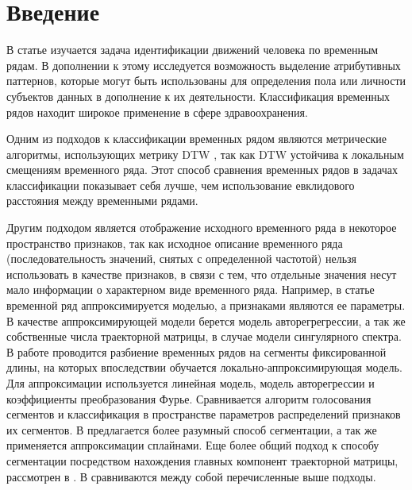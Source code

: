 \documentclass[12pt, twoside]{article}
\begin{document}

\maketitle
\linenumbers

\section{Введение}
В статье изучается задача идентификации движений человека по временным рядам. В дополнении к этому исследуется возможность выделение атрибутивных паттернов, которые могут быть использованы для определения пола или личности субъектов данных в дополнение к их деятельности. Классификация временных рядов находит широкое применение в сфере здравоохранения.

Одним из подходов к классификации временных рядом являются метрические алгоритмы, использующих метрику DTW \cite{Isachenko16}, так как DTW устойчива к локальным смещениям временного ряда. Этот способ сравнения временных рядов в задачах классификации показывает себя лучше, чем использование евклидового расстояния между временными рядами. 

Другим подходом является отображение исходного временного ряда в некоторое пространство признаков, так как исходное описание временного ряда (последовательность значений, снятых с определенной частотой) нельзя использовать в качестве признаков, в связи с тем, что отдельные значения несут мало информации о характерном виде временного ряда. Например, в статье \cite{Ivkin15} временной ряд аппроксимируется моделью, а признаками являются ее параметры. В качестве аппроксимирующей модели берется модель авторегрегрессии, а так же собственные числа траекторной матрицы, в случае модели сингулярного спектра. В работе \cite{Karasikov16} проводится разбиение временных рядов на сегменты фиксированной длины, на которых впоследствии обучается локально-аппроксимирующая модель. Для аппроксимации используется линейная модель, модель авторегрессии и коэффициенты преобразования Фурье. Сравнивается алгоритм голосования сегментов и классификация в пространстве параметров распределений признаков их сегментов.  В \cite{Anikeev18} предлагается более разумный способ сегментации, а так же применяется аппроксимации сплайнами. Еще более общий подход к способу сегментации посредством нахождения главных компонент траекторной матрицы, рассмотрен в \cite{Motrenko16}. В \cite{Bochkarev18} сравниваются между собой перечисленные выше подходы.
\end{document}
